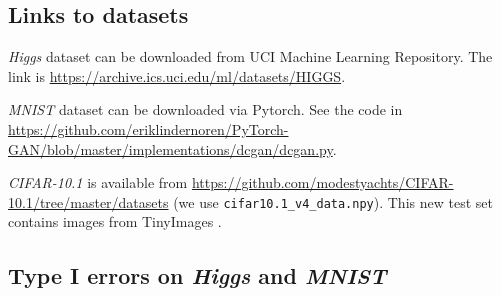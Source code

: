 \documentclass{article}
\begin{document}
\subsection{Links to datasets}
\emph{Higgs} dataset can be downloaded from UCI Machine Learning Repository. The link is \url{https://archive.ics.uci.edu/ml/datasets/HIGGS}.

\emph{MNIST} dataset can be downloaded via Pytorch. See the code in \url{https://github.com/eriklindernoren/PyTorch-GAN/blob/master/implementations/dcgan/dcgan.py}.

\emph{CIFAR-10.1} is available from \url{https://github.com/modestyachts/CIFAR-10.1/tree/master/datasets} (we use \texttt{cifar10.1\_v4\_data.npy}). This new test set contains  images from TinyImages \citep{torralba2008tinyimages}.






































\subsection{Type I errors on \emph{Higgs} and \emph{MNIST}} \label{sec:typeI}
\end{document}
